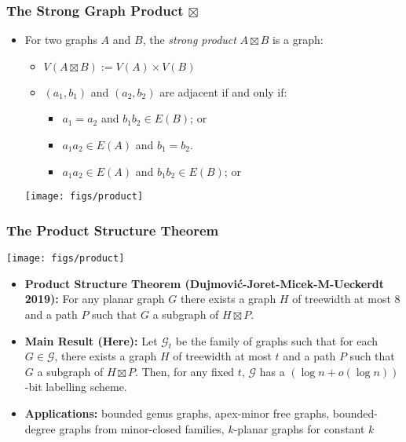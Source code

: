 \documentclass[aspectratio=169,xcolor=dvipsnames]{beamer}
\begin{document}
\begin{frame}
    \frametitle{The Strong Graph Product $\boxtimes$}

    \begin{itemize}
        \item[] For two graphs $A$ and $B$, the \emph{strong product} $A\boxtimes B$ is a graph:
        \begin{itemize}
            \item $V(A\boxtimes B):=V(A)\times V(B)$
            \item $(a_1,b_1)$ and $(a_2,b_2)$ are adjacent if and only if:
            \begin{itemize}
                \item $a_1=a_2$ and $b_1b_2\in E(B)$; or
                \item $a_1a_2 \in E(A)$ and $b_1=b_2$.
                \item  $a_1a_2 \in E(A)$ and $b_1b_2 \in E(B)$; or
            \end{itemize}
        \end{itemize}
        \begin{center}
            \texttt{[image: figs/product]}
        \end{center}
    \end{itemize}
\end{frame}


\begin{frame}
    \frametitle{The Product Structure Theorem}

    \begin{center}
        \texttt{[image: figs/product]}
    \end{center}

    \begin{itemize}
        \item<+->\textbf{Product Structure Theorem (Dujmović-Joret-Micek-M-Ueckerdt 2019):} For any planar graph $G$ there exists a graph $H$ of treewidth at most $8$ and a path $P$ such that $G$ a subgraph of $H\boxtimes P$.

        \item<+->\textbf{Main Result (Here):} Let $\mathcal{G}_t$ be the family of graphs such that for each $G\in\mathcal{G}$, there exists a graph $H$ of treewidth at most $t$ and a path $P$ such that $G$ a subgraph of $H\boxtimes P$.  Then, for any fixed $t$, $\mathcal{G}$ has a $(\log n + o(\log n))$-bit labelling scheme.

        \item<+->\textbf{Applications:} bounded genus graphs, apex-minor free graphs, bounded-degree graphs from minor-closed families, $k$-planar graphs for constant $k$
    \end{itemize}
\end{frame}
\end{document}
